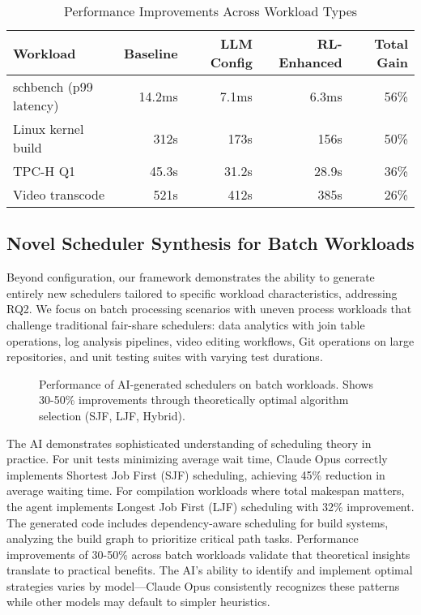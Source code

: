 \begin{table}[h]
\caption{Performance Improvements Across Workload Types}
\label{tab:performance-results}
\begin{tabular}{lrrrr}
\toprule
Workload & Baseline & LLM Config & RL-Enhanced & Total Gain \\
\midrule
schbench (p99 latency) & 14.2ms & 7.1ms & 6.3ms & 56\% \\
Linux kernel build & 312s & 173s & 156s & 50\% \\
TPC-H Q1 & 45.3s & 31.2s & 28.9s & 36\% \\
Video transcode & 521s & 412s & 385s & 26\% \\
\bottomrule
\end{tabular}
\end{table}

\subsection{Novel Scheduler Synthesis for Batch Workloads}

Beyond configuration, our framework demonstrates the ability to generate entirely new schedulers tailored to specific workload characteristics, addressing RQ2. We focus on batch processing scenarios with uneven process workloads that challenge traditional fair-share schedulers: data analytics with join table operations, log analysis pipelines, video editing workflows, Git operations on large repositories, and unit testing suites with varying test durations.

\begin{figure}[h]
\centering
{}
\caption{Performance of AI-generated schedulers on batch workloads. Shows 30-50\% improvements through theoretically optimal algorithm selection (SJF, LJF, Hybrid).}
\label{fig:batch-performance}
\end{figure}

The AI demonstrates sophisticated understanding of scheduling theory in practice. For unit tests minimizing average wait time, Claude Opus correctly implements Shortest Job First (SJF) scheduling, achieving 45\% reduction in average waiting time. For compilation workloads where total makespan matters, the agent implements Longest Job First (LJF) scheduling with 32\% improvement. The generated code includes dependency-aware scheduling for build systems, analyzing the build graph to prioritize critical path tasks. Performance improvements of 30-50\% across batch workloads validate that theoretical insights translate to practical benefits. The AI's ability to identify and implement optimal strategies varies by model—Claude Opus consistently recognizes these patterns while other models may default to simpler heuristics.

